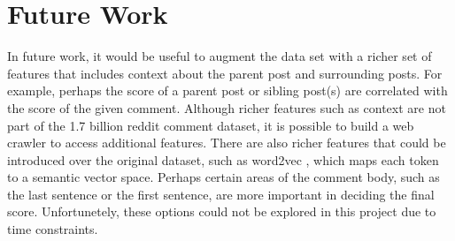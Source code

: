 \documentclass[11pt, twocolumn]{article}
\begin{document}
\section{Future Work}
	
	In future work, it would be useful to augment the data set with a richer set of features that includes context about the parent post and surrounding posts. For example, perhaps the score of a parent post or sibling post(s) are correlated with the score of the given comment. Although richer features such as context are not part of the 1.7 billion reddit comment dataset, it is possible to build a web crawler to access additional features. There are also richer features that could be introduced over the original dataset, such as word2vec \cite{word2vec}, which maps each token to a semantic vector space. Perhaps certain areas of the comment body, such as the last sentence or the first sentence, are more important in deciding the final score. Unfortunetely, these options could not be explored in this project due to time constraints.




\end{document}
